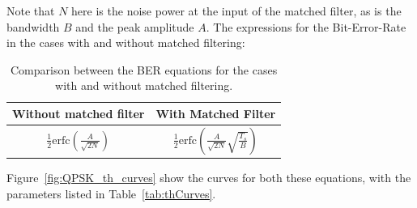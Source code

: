 \begin{refsection}
Note that $N$ here is the noise power at the input of the matched filter, as is the bandwidth $B$ and the peak amplitude $A$. The expressions for the Bit-Error-Rate in the cases with and without matched filtering:

\begin{table}[H]
	\centering
	\begin{tabulary}{1.0\textwidth}{|c|c|}
		\hline
		\textbf{Without matched filter} 								& \textbf{With Matched Filter} \\ \hline
		$ \frac{1}{2} \text{erfc} \left( \frac{A}{\sqrt{2N}} \right) $	& $ \frac{1}{2} \text{erfc}\left(\frac{A}{\sqrt{2N}} \sqrt{\frac{T_s}{B}}\right)  $ \\ \hline
	\end{tabulary}
	
	\caption{Comparison between the BER equations for the cases with and without matched filtering.\label{tab:ber_qpsk}}
\end{table}

Figure~\ref{fig:QPSK_th_curves} show the curves for both these equations, with the parameters listed in Table~\ref{tab:thCurves}.


\end{refsection}
